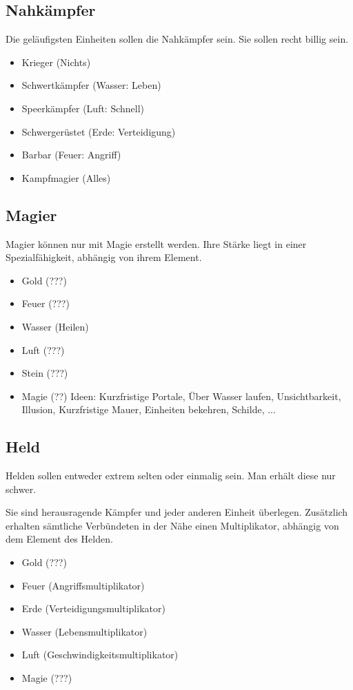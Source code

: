 \subsection{Nahkämpfer}
Die geläufigsten Einheiten sollen die Nahkämpfer sein. Sie sollen recht billig sein.


\begin{itemize}
\item Krieger (Nichts)
\item Schwertkämpfer (Wasser: Leben)
\item Speerkämpfer (Luft: Schnell)
\item Schwergerüstet (Erde: Verteidigung)
\item Barbar (Feuer: Angriff)
\item Kampfmagier (Alles)
\end{itemize}

\subsection{Magier}
Magier können nur mit Magie erstellt werden. Ihre Stärke liegt in einer Spezialfähigkeit, abhängig von ihrem Element. 

\begin{itemize}
\item Gold (???)
\item Feuer (???)
\item Wasser (Heilen)
\item Luft (???)
\item Stein (???)
\item Magie (??)
 Ideen: Kurzfristige Portale, Über Wasser laufen, Unsichtbarkeit, Illusion, Kurzfristige Mauer, Einheiten bekehren, Schilde, ...
\end{itemize}

\subsection{Held}
Helden sollen entweder extrem selten oder einmalig sein. Man erhält diese nur schwer.

Sie sind herausragende Kämpfer und jeder anderen Einheit überlegen. Zusätzlich erhalten sämtliche Verbündeten in der Nähe einen Multiplikator, abhängig von dem Element des Helden.

\begin{itemize}
\item Gold (???)
\item Feuer (Angriffsmultiplikator)
\item Erde (Verteidigungsmultiplikator)
\item Wasser (Lebensmultiplikator)
\item Luft (Geschwindigkeitsmultiplikator)
\item Magie (???)
\end{itemize}

